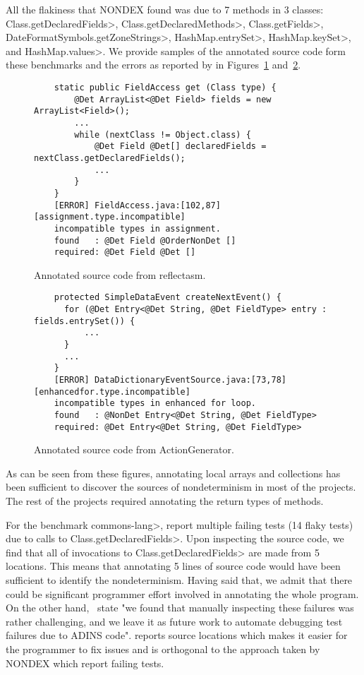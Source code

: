 All the flakiness that NONDEX found was due to 7 methods in 3 classes:
\<Class.getDeclaredFields>, \<Class.getDeclaredMethods>, \<Class.getFields>, \<DateFormatSymbols.getZoneStrings>,
\<HashMap.entrySet>, \<HashMap.keySet>, and \<HashMap.values>.  
We provide samples of the annotated source code form these benchmarks and the errors as reported by \TheDeterminismChecker 
in Figures~\ref{code-reflectasm} and~\ref{code-actiongenerator}.
\begin{figure}
    \begin{verbatim}
    static public FieldAccess get (Class type) {
        @Det ArrayList<@Det Field> fields = new ArrayList<Field>();
        ...
        while (nextClass != Object.class) {
            @Det Field @Det[] declaredFields = nextClass.getDeclaredFields();
            ...
        }
    }
    [ERROR] FieldAccess.java:[102,87] [assignment.type.incompatible] 
    incompatible types in assignment.
    found   : @Det Field @OrderNonDet []
    required: @Det Field @Det []
    \end{verbatim}
    \caption{Annotated source code from reflectasm.}
    \label{code-reflectasm}
\end{figure}
\begin{figure}
    \begin{verbatim}
    protected SimpleDataEvent createNextEvent() {
      for (@Det Entry<@Det String, @Det FieldType> entry : fields.entrySet()) {
          ...
      }
      ...
    }
    [ERROR] DataDictionaryEventSource.java:[73,78] [enhancedfor.type.incompatible] 
    incompatible types in enhanced for loop.
    found   : @NonDet Entry<@Det String, @Det FieldType>
    required: @Det Entry<@Det String, @Det FieldType>
    \end{verbatim}
    \caption{Annotated source code from ActionGenerator.}
    \label{code-actiongenerator}
\end{figure}
As can be seen from these figures, annotating local arrays and collections
has been sufficient to discover the sources of nondeterminism in most of the projects.
The rest of the projects required annotating the return types of methods.

For the benchmark \<commons-lang>, \cite{nondex} report multiple failing tests (14 flaky tests) due to calls
to \<Class.getDeclaredFields>. Upon inspecting the source code, we find that all of invocations to
\<Class.getDeclaredFields> are made from 5 locations. This means that annotating 5 lines of source code
would have been sufficient to identify the nondeterminism. Having said that, we admit that there could be
significant programmer effort involved in annotating the whole program. On the other hand,~\cite{nondex}
state "we found that manually inspecting these failures was
rather challenging, and we leave it as future work to automate
debugging test failures due to ADINS code". \TheDeterminismChecker reports source locations
which makes it easier for the programmer to fix issues and is orthogonal to the approach taken by NONDEX which
report failing tests.

